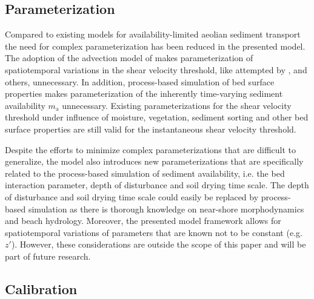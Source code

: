 \subsection{Parameterization}

Compared to existing models for availability-limited aeolian sediment
transport the need for complex parameterization has been reduced in
the presented model. The adoption of the advection model of
\citet{deVries2014a} makes parameterization of spatiotemporal
variations in the shear velocity threshold, like attempted by
\citet{Nickling1995}, \citet{Dong2004b} and others, unnecessary. In
addition, process-based simulation of bed surface properties makes
parameterization of the inherently time-varying sediment availability
$m_{\mathrm{a}}$ unnecessary. Existing parameterizations for the shear
velocity threshold under influence of moisture, vegetation, sediment
sorting and other bed surface properties are still valid for the
instantaneous shear velocity threshold.

Despite the efforts to minimize complex parameterizations that are
difficult to generalize, the model also introduces new
parameterizations that are specifically related to the process-based
simulation of sediment availability, i.e. the bed interaction
parameter, depth of disturbance and soil drying time scale. The depth
of disturbance and soil drying time scale could easily be replaced by
process-based simulation as there is thorough knowledge on near-shore
morphodynamics and beach hydrology. Moreover, the presented model
framework allows for spatiotemporal variations of parameters that are
known not to be constant (e.g. $z'$). However, these considerations
are outside the scope of this paper and will be part of future
research.

\subsection{Calibration}

